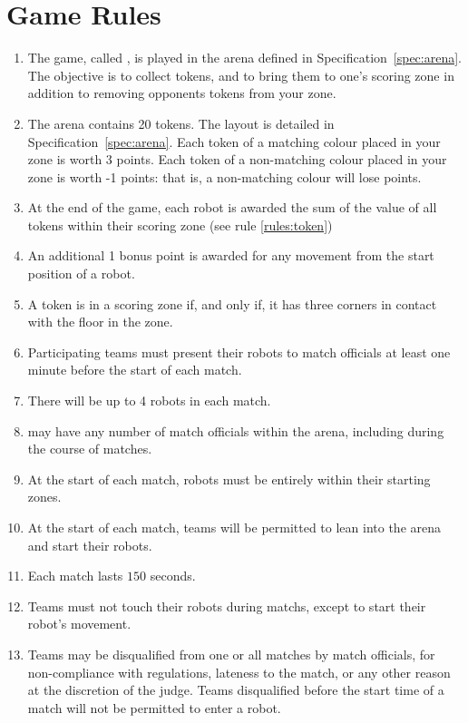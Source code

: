 \section{Game Rules}
\label{sec:rules}

\begin{enumerate}
  \item The game, called \emph{\gamename}, is played in the arena defined in
        Specification~\ref{spec:arena}. The objective is to collect tokens, and
        to bring them to one's scoring zone in addition to removing opponents
        tokens from your zone.
  \item The arena contains 20 tokens. The layout is detailed in
        Specification~\ref{spec:arena}. Each token of a matching colour placed
        in your zone is worth 3 points. Each token of a non-matching colour
        placed in your zone is worth -1 points: that is, a non-matching colour
        will lose points.
  \item At the end of the game, each robot is awarded the sum of the value of
        all tokens within their scoring zone (see rule \ref{rules:token})
  \item An additional 1 bonus point is awarded for any movement from the
        start position of a robot.
  \item \label{rules:token}A token is in a scoring zone if, and only if, it
        has three corners in contact with the floor in the zone.
  \item Participating teams must present their robots to match officials at
        least one minute before the start of each match.
  \item There will be up to 4 robots in each match.
  \item \org may have any number of match officials within the arena, including
        during the course of matches.
  \item At the start of each match, robots must be entirely within their
        starting zones.
  \item At the start of each match, teams will be permitted to lean into the
        arena and start their robots.
  \item Each match lasts $150$ seconds.
  \item Teams must not touch their robots during matchs, except to start their
        robot's movement.
  \item Teams may be disqualified from one or all matches by match officials,
        for non-compliance with regulations, lateness to the match, or any other
        reason at the discretion of the judge. Teams disqualified before the
        start time of a match will not be permitted to enter a robot.
\end{enumerate}
